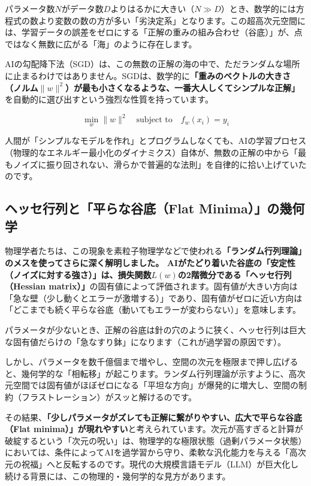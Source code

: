 パラメータ数\(N\)がデータ数\(D\)よりはるかに大きい（\(N \gg D\)）とき、数学的には方程式の数より変数の数の方が多い「劣決定系」となります。この超高次元空間には、学習データの誤差をゼロにする「正解の重みの組み合わせ（谷底）」が、点ではなく無数に広がる「海」のように存在します。

AIの勾配降下法（SGD）は、この無数の正解の海の中で、ただランダムな場所に止まるわけではありません。SGDは、数学的に\textbf{「重みのベクトルの大きさ（ノルム\(\|w\|^2\)）が最も小さくなるような、一番大人しくてシンプルな正解」}を自動的に選び出すという強烈な性質を持っています。

\[\min_w \|w\|^2 \quad \text{subject to} \quad f_w(x_i) = y_i\]

人間が「シンプルなモデルを作れ」とプログラムしなくても、AIの学習プロセス（物理的なエネルギー最小化のダイナミクス）自体が、無数の正解の中から「最もノイズに振り回されない、滑らかで普遍的な法則」を自律的に拾い上げていたのです。

\subsection{ヘッセ行列と「平らな谷底（Flat Minima）」の幾何学}

物理学者たちは、この現象を素粒子物理学などで使われる\textbf{「ランダム行列理論」のメスを使ってさらに深く解明しました。 AIがたどり着いた谷底の「安定性（ノイズに対する強さ）」は、損失関数\(L(w)\)の2階微分である「ヘッセ行列（Hessian matrix）」}の固有値によって評価されます。固有値が大きい方向は「急な壁（少し動くとエラーが激増する）」であり、固有値がゼロに近い方向は「どこまでも続く平らな谷底（動いてもエラーが変わらない）」を意味します。

パラメータが少ないとき、正解の谷底は針の穴のように狭く、ヘッセ行列は巨大な固有値だらけの「急なすり鉢」になります（これが過学習の原因です）。

しかし、パラメータを数千億個まで増やし、空間の次元を極限まで押し広げると、幾何学的な「相転移」が起こります。ランダム行列理論が示すように、高次元空間では固有値がほぼゼロになる「平坦な方向」が爆発的に増大し、空間の制約（フラストレーション）がスッと解けるのです。

その結果、\textbf{「少しパラメータがズレても正解に繋がりやすい、広大で平らな谷底（Flat minima）」が現れやすい}と考えられています。次元が高すぎると計算が破綻するという「次元の呪い」は、物理学的な極限状態（過剰パラメータ状態）においては、条件によってAIを過学習から守り、柔軟な汎化能力を与える「高次元の祝福」へと反転するのです。現代の大規模言語モデル（LLM）が巨大化し続ける背景には、この物理的・幾何学的な見方があります。

